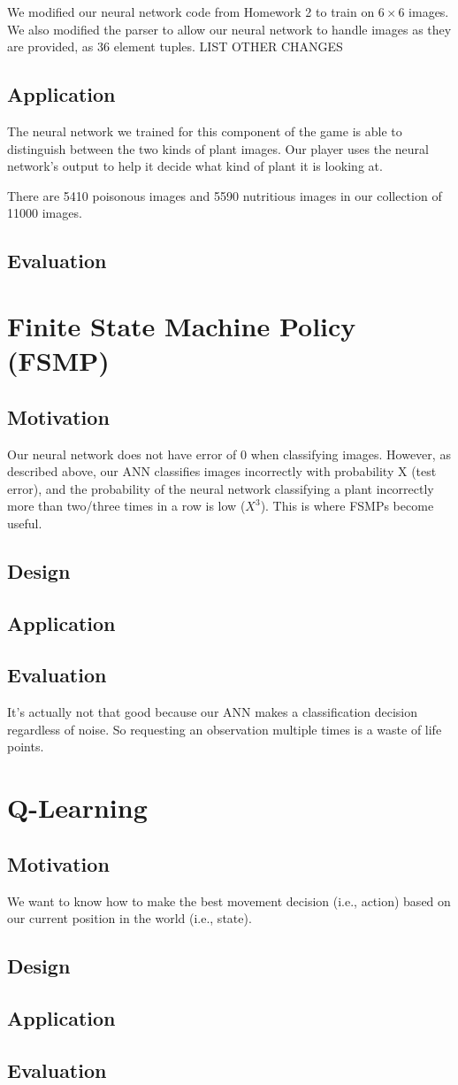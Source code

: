 \documentclass[solution, letterpaper]{cs121}
\begin{document}
We modified our neural network code from Homework 2 to train on $6 \times 6$ images. We also modified the parser to allow our neural network to handle images as they are provided, as 36 element tuples. LIST OTHER CHANGES

\subsection{Application}
The neural network we trained for this component of the game is able to distinguish between the two kinds of plant images. Our player uses the neural network's output to help it decide what kind of plant it is looking at.

There are 5410 poisonous images and 5590 nutritious images in our collection of 11000 images.

\subsection{Evaluation}

\section{Finite State Machine Policy (FSMP)}
\subsection{Motivation}
Our neural network does not have error of 0 when classifying images. However, as described above, our ANN classifies images incorrectly with probability X (test error), and the probability of the neural network classifying a plant incorrectly more than two/three times in a row is low ($X^3$). This is where FSMPs become useful.

\subsection{Design}
\subsection{Application}
\subsection{Evaluation}
It's actually not that good because our ANN makes a classification decision regardless of noise. So requesting an observation multiple times is a waste of life points. 

\section{Q-Learning}
\subsection{Motivation}
We want to know how to make the best movement decision (i.e., action) based on our current position in the world (i.e., state).

\subsection{Design}
\subsection{Application}
\subsection{Evaluation}
\end{document}
